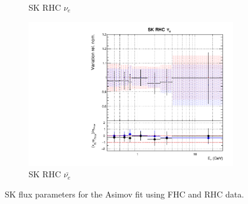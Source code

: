 \begin{figure}[t]
\begin{subfigure}{0.45\textwidth}
  \caption{SK RHC $\nu_{e}$}
\end{subfigure}
\begin{subfigure}{0.45\textwidth}
  \centering
  \includegraphics[width=0.75\linewidth]{figs/rhcmpasmvflux15}
  \caption{SK RHC $\bar{\nu_e}$}
\end{subfigure}
\caption{SK flux parameters for the Asimov fit using FHC and RHC data.}
\label{fig:rhcmpiasmvSK}
\end{figure}

